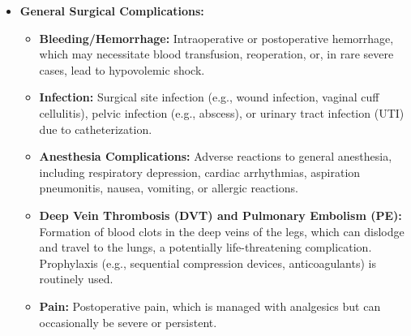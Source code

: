 \begin{itemize}
  \item \textbf{General Surgical Complications:}
    \begin{itemize}
      \item \textbf{Bleeding/Hemorrhage:} Intraoperative or postoperative hemorrhage, which may necessitate blood transfusion, reoperation, or, in rare severe cases, lead to hypovolemic shock.
      \item \textbf{Infection:} Surgical site infection (e.g., wound infection, vaginal cuff cellulitis), pelvic infection (e.g., abscess), or urinary tract infection (UTI) due to catheterization.
      \item \textbf{Anesthesia Complications:} Adverse reactions to general anesthesia, including respiratory depression, cardiac arrhythmias, aspiration pneumonitis, nausea, vomiting, or allergic reactions.
      \item \textbf{Deep Vein Thrombosis (DVT) and Pulmonary Embolism (PE):} Formation of blood clots in the deep veins of the legs, which can dislodge and travel to the lungs, a potentially life-threatening complication. Prophylaxis (e.g., sequential compression devices, anticoagulants) is routinely used.
      \item \textbf{Pain:} Postoperative pain, which is managed with analgesics but can occasionally be severe or persistent.
    \end{itemize}


\end{itemize}
